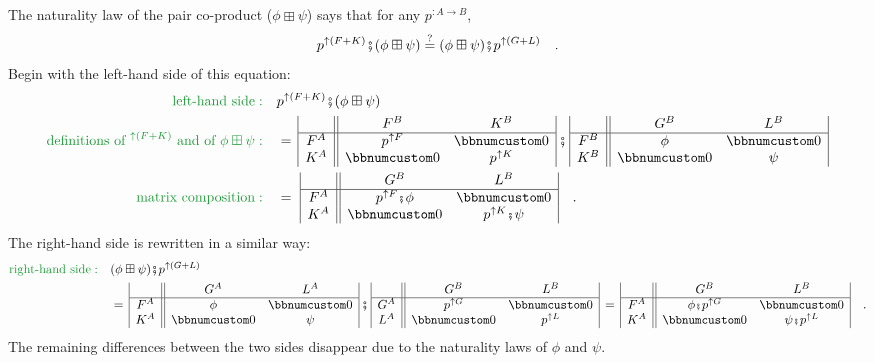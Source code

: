 The naturality law of the pair co-product ($\phi\boxplus\psi$) says
that for any $p^{:A\rightarrow B}$,
\[
p^{\uparrow(F+K)}\bef(\phi\boxplus\psi)\overset{?}{=}(\phi\boxplus\psi)\bef p^{\uparrow(G+L)}\quad.
\]
Begin with the left-hand side of this equation:
\begin{align*}
{\color{greenunder}\text{left-hand side}:}\quad & p^{\uparrow(F+K)}\bef(\phi\boxplus\psi)\\
{\color{greenunder}\text{definitions of }^{\uparrow(F+K)}\text{ and of }\phi\boxplus\psi:}\quad & =\,\begin{array}{|c||cc|}
 & F^{B} & K^{B}\\
\hline F^{A} & p^{\uparrow F} & \bbnum 0\\
K^{A} & \bbnum 0 & p^{\uparrow K}
\end{array}\,\bef\,\begin{array}{|c||cc|}
 & G^{B} & L^{B}\\
\hline F^{B} & \phi & \bbnum 0\\
K^{B} & \bbnum 0 & \psi
\end{array}\\
{\color{greenunder}\text{matrix composition}:}\quad & =\,\,\begin{array}{|c||cc|}
 & G^{B} & L^{B}\\
\hline F^{A} & p^{\uparrow F}\bef\phi & \bbnum 0\\
K^{A} & \bbnum 0 & p^{\uparrow K}\bef\psi
\end{array}\quad.
\end{align*}
The right-hand side is rewritten in a similar way:
\begin{align*}
{\color{greenunder}\text{right-hand side}:}\quad & (\phi\boxplus\psi)\bef p^{\uparrow(G+L)}\\
 & =\,\begin{array}{|c||cc|}
 & G^{A} & L^{A}\\
\hline F^{A} & \phi & \bbnum 0\\
K^{A} & \bbnum 0 & \psi
\end{array}\,\bef\,\begin{array}{|c||cc|}
 & G^{B} & L^{B}\\
\hline G^{A} & p^{\uparrow G} & \bbnum 0\\
L^{A} & \bbnum 0 & p^{\uparrow L}
\end{array}\,=\,\begin{array}{|c||cc|}
 & G^{B} & L^{B}\\
\hline F^{A} & \phi\bef p^{\uparrow G} & \bbnum 0\\
K^{A} & \bbnum 0 & \psi\bef p^{\uparrow L}
\end{array}\quad.
\end{align*}
The remaining differences between the two sides disappear due to the
naturality laws of $\phi$ and $\psi$. 

